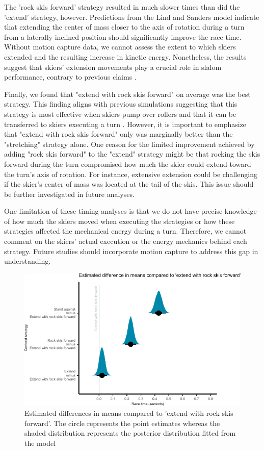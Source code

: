 The 'rock skis forward' strategy resulted in much slower times than did the 'extend' strategy, however. Predictions from the Lind and Sanders model \cite{lind_physics_2013} indicate that extending the center of mass closer to the axis of rotation during a turn from a laterally inclined position should significantly improve the race time. Without motion capture data, we cannot assess the extent to which skiers extended and the resulting increase in kinetic energy. Nonetheless, the results suggest that skiers' extension movements play a crucial role in slalom performance, contrary to previous claims \cite{supej_differential_2008}.

Finally, we found that "extend with rock skis forward" on average was the best strategy. This finding aligns with previous simulations suggesting that this strategy is most effective when skiers pump over rollers \cite{mote_accelerations_1983} and that it can be transferred to skiers executing a turn \cite{reid_kinematic_2010}. However, it is important to emphasize that "extend with rock skis forward" only was marginally better than the "stretching" strategy alone. One reason for the limited improvement achieved by adding "rock skis forward" to the "extend" strategy might be that rocking the skis forward during the turn compromised how much the skier could extend toward the turn's axis of rotation. For instance, extensive extension could be challenging if the skier's center of mass was located at the tail of the skis. This issue should be further investigated in future analyses.

One limitation of these timing analyses is that we do not have precise knowledge of how much the skiers moved when executing the strategies or how these strategies affected the mechanical energy during a turn. Therefore, we cannot comment on the skiers' actual execution or the energy mechanics behind each strategy. Future studies should incorporate motion capture to address this gap in understanding.



\begin{figure}[H]
\centering
\includegraphics{figure_results_Q1_strategies.pdf}
\caption{Estimated differences in means compared to 'extend with rock skis forward'. The circle represents the point estimates whereas the shaded distribution represents the posterior distribution fitted from the model}
\label{fig:q1_strategieseffect}
\end{figure}



